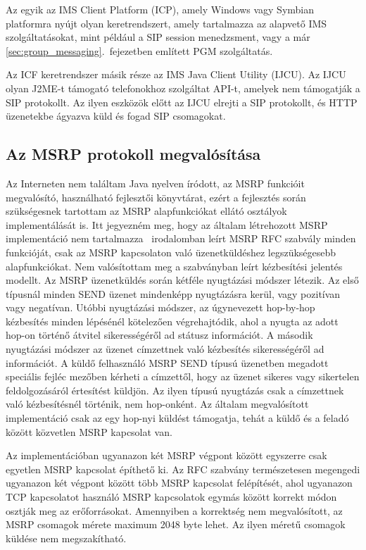 Az egyik az IMS Client Platform (ICP), amely Windows vagy Symbian platformra nyújt olyan keretrendszert, amely tartalmazza az alapvető IMS szolgáltatásokat, mint például a SIP session menedzsment, vagy a már \ref{sec:group_messaging}.~fejezetben említett PGM szolgáltatás.

Az ICF keretrendszer másik része az IMS Java Client Utility (IJCU). Az IJCU olyan J2ME-t támogató telefonokhoz szolgáltat API-t, amelyek nem támogatják a SIP protokollt. Az ilyen eszközök előtt az IJCU  elrejti a SIP protokollt, és HTTP üzenetekbe ágyazva küld és fogad SIP csomagokat.

\newpage 

\subsection{Az MSRP protokoll megvalósítása}
\label{sec:msrp_implementacio}

Az Interneten nem találtam Java nyelven íródott, az MSRP funkcióit megvalósító, használható fejlesztői könyvtárat, ezért a fejlesztés során szükségesnek tartottam az MSRP alapfunkciókat ellátó osztályok implementálását is. Itt jegyezném meg, hogy az általam létrehozott MSRP implementáció nem tartalmazza ~irodalomban leírt MSRP RFC szabvály minden funkcióját, csak az MSRP kapcsolaton való üzenetküldéshez legszükségesebb alapfunkciókat. Nem valósítottam meg a szabványban leírt kézbesítési jelentés modellt. Az MSRP üzenetküldés során kétféle nyugtázási módszer létezik. Az első típusnál minden SEND üzenet mindenképp nyugtázásra kerül, vagy pozitívan vagy negatívan. Utóbbi nyugtázási módszer, az úgynevezett hop-by-hop kézbesítés minden lépésénél kötelezően végrehajtódik, ahol a nyugta az adott hop-on történő átvitel sikerességéről ad státusz információt. A második nyugtázási módszer az üzenet címzettnek való kézbesítés sikerességéről ad információt. A küldő felhasználó MSRP SEND típusú üzenetben megadott speciális fejléc mezőben kérheti a címzettől, hogy az üzenet sikeres vagy sikertelen feldolgozásáról értesítést küldjön. Az ilyen típusú nyugtázás csak a címzettnek való kézbesítésnél történik, nem hop-onként. Az általam megvalósított implementáció csak az egy hop-nyi küldést támogatja, tehát a küldő és a feladó között közvetlen MSRP kapcsolat van.

Az implementációban ugyanazon két MSRP végpont között egyszerre csak egyetlen MSRP kapcsolat építhető ki. Az RFC szabvány természetesen megengedi ugyanazon két végpont között több MSRP kapcsolat felépítését, ahol ugyanazon TCP kapcsolatot használó MSRP kapcsolatok egymás között korrekt módon osztják meg az erőforrásokat. Amennyiben a korrektség nem megvalósított, az MSRP csomagok mérete maximum 2048 byte lehet. Az ilyen méretű csomagok küldése nem megszakítható.

